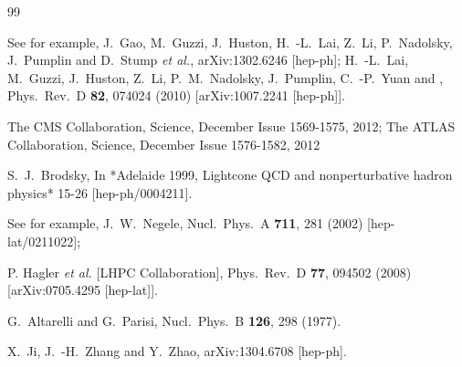 \documentclass[aps,prd,preprint,tightenlines,superscriptaddress]{revtex4}
\begin{document}
\begin{thebibliography}{99}

See for example,
  J.~Gao, M.~Guzzi, J.~Huston, H.~-L.~Lai, Z.~Li, P.~Nadolsky, J.~Pumplin and D.~Stump {\it et al.},
  arXiv:1302.6246 [hep-ph];
  H.~-L.~Lai, M.~Guzzi, J.~Huston, Z.~Li, P.~M.~Nadolsky, J.~Pumplin, C.~-P.~Yuan and ,
  Phys.\ Rev.\ D {\bf 82}, 074024 (2010)
  [arXiv:1007.2241 [hep-ph]].

The CMS Collaboration, Science,  December Issue 1569-1575, 2012;
The ATLAS Collaboration, Science, December Issue 1576-1582, 2012

  S.~J.~Brodsky,
  In *Adelaide 1999, Lightcone QCD and nonperturbative hadron physics* 15-26
  [hep-ph/0004211].

See for example, %
  J.~W.~Negele,
  Nucl.\ Phys.\ A {\bf 711}, 281 (2002)
  [hep-lat/0211022];

  P. Hagler {\it et al.}  [LHPC Collaboration],
  Phys.\ Rev.\ D {\bf 77}, 094502 (2008)
  [arXiv:0705.4295 [hep-lat]].


  G.~Altarelli and G.~Parisi,
  Nucl.\ Phys.\ B {\bf 126}, 298 (1977).


  X.~Ji, J.~-H.~Zhang and Y.~Zhao,
  arXiv:1304.6708 [hep-ph].


\end{thebibliography}
\end{document}
